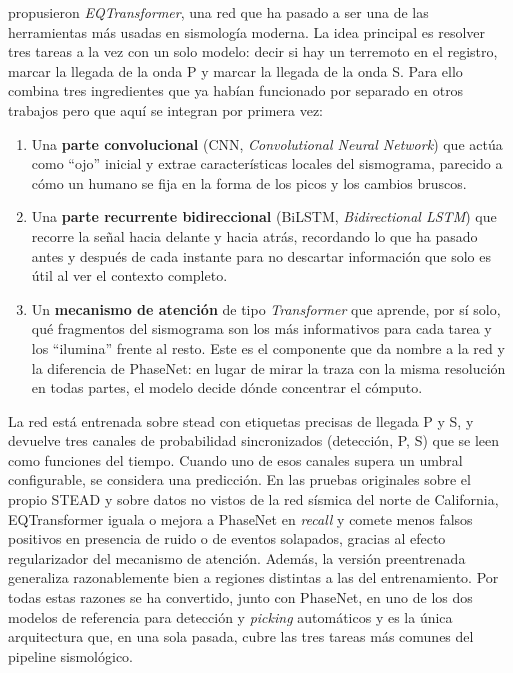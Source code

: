 \citet{mousavi2020eqtransformer} propusieron \emph{EQTransformer}, una red que ha pasado a ser una de las herramientas más usadas en sismología moderna. La idea principal es resolver tres tareas a la vez con un solo modelo: decir si hay un terremoto en el registro, marcar la llegada de la onda P y marcar la llegada de la onda S. Para ello combina tres ingredientes que ya habían funcionado por separado en otros trabajos pero que aquí se integran por primera vez:

\begin{enumerate}
  \item Una \textbf{parte convolucional} (CNN, \textit{Convolutional Neural Network}) que actúa como ``ojo'' inicial y extrae características locales del sismograma, parecido a cómo un humano se fija en la forma de los picos y los cambios bruscos.
  \item Una \textbf{parte recurrente bidireccional} (BiLSTM, \textit{Bidirectional LSTM}) que recorre la señal hacia delante y hacia atrás, recordando lo que ha pasado antes y después de cada instante para no descartar información que solo es útil al ver el contexto completo.
  \item Un \textbf{mecanismo de atención} de tipo \textit{Transformer} que aprende, por sí solo, qué fragmentos del sismograma son los más informativos para cada tarea y los ``ilumina'' frente al resto. Este es el componente que da nombre a la red y la diferencia de PhaseNet: en lugar de mirar la traza con la misma resolución en todas partes, el modelo decide dónde concentrar el cómputo.
\end{enumerate}

La red está entrenada sobre \gls{stead} con etiquetas precisas de llegada P y S, y devuelve tres canales de probabilidad sincronizados (detección, P, S) que se leen como funciones del tiempo. Cuando uno de esos canales supera un umbral configurable, se considera una predicción. En las pruebas originales sobre el propio STEAD y sobre datos no vistos de la red sísmica del norte de California, EQTransformer iguala o mejora a PhaseNet en \textit{recall} y comete menos falsos positivos en presencia de ruido o de eventos solapados, gracias al efecto regularizador del mecanismo de atención. Además, la versión preentrenada generaliza razonablemente bien a regiones distintas a las del entrenamiento. Por todas estas razones se ha convertido, junto con PhaseNet, en uno de los dos modelos de referencia para detección y \textit{picking} automáticos y es la única arquitectura que, en una sola pasada, cubre las tres tareas más comunes del pipeline sismológico.

